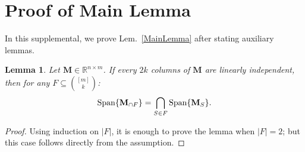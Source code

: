 \documentclass[9pt,twocolumn]{pnas-new}
\newtheorem{lemma}{Lemma}
\begin{document}


\pnasbreak

\section{Proof of Main Lemma}

In this supplemental, we prove Lem.~\ref{MainLemma} after stating auxiliary lemmas.

\begin{lemma}\label{SpanIntersectionLemma}
Let $\mathbf{M} \in \mathbb{R}^{n \times m}$. If every $2k$ columns of $\mathbf{M}$ are linearly independent, then for any $F \subseteq {[m] \choose k}$:
\begin{align*}
\text{\rm Span}\{\mathbf{M}_{\cap F}\}  = \bigcap_{S \in F} \text{\rm Span}\{\mathbf{M}_S\}.
\end{align*}
\end{lemma}
\begin{proof}
Using induction on $|F|$, it is enough to prove the lemma when $|F| = 2$; but this case follows directly from the assumption.
\end{proof}
\end{document}
